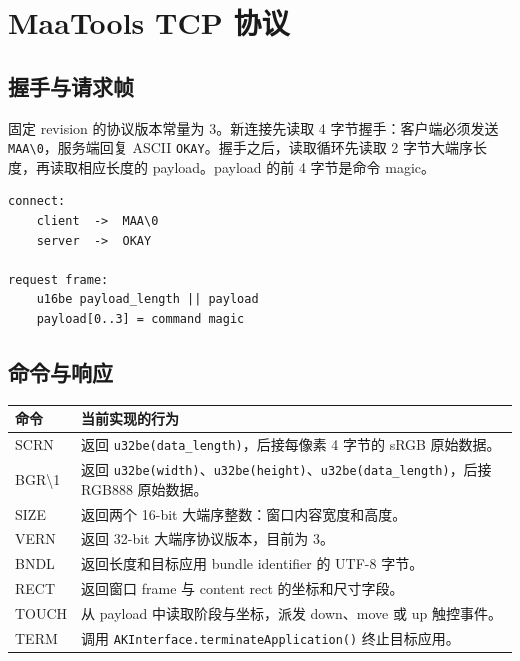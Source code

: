 \documentclass[UTF8,a4paper,11pt]{ctexart}
\begin{document}
\section{MaaTools TCP 协议}

\subsection{握手与请求帧}

固定 revision 的协议版本常量为 3。新连接先读取 4 字节握手：客户端必须发送 \texttt{MAA\textbackslash{}0}，服务端回复 ASCII \texttt{OKAY}。握手之后，读取循环先读取 2 字节大端序长度，再读取相应长度的 payload。payload 的前 4 字节是命令 magic。

\begin{lstlisting}
connect:
    client  ->  MAA\0
    server  ->  OKAY

request frame:
    u16be payload_length || payload
    payload[0..3] = command magic
\end{lstlisting}

\subsection{命令与响应}

\begin{center}
\small
\begin{tabularx}{\textwidth}{>{\ttfamily\raggedright\arraybackslash}p{} X}
\toprule
命令 & 当前实现的行为 \\
\midrule
SCRN & 返回 \texttt{u32be(data\_length)}，后接每像素 4 字节的 sRGB 原始数据。\\
BGR\textbackslash{}1 & 返回 \texttt{u32be(width)}、\texttt{u32be(height)}、\texttt{u32be(data\_length)}，后接 RGB888 原始数据。\\
SIZE & 返回两个 16-bit 大端序整数：窗口内容宽度和高度。\\
VERN & 返回 32-bit 大端序协议版本，目前为 3。\\
BNDL & 返回长度和目标应用 bundle identifier 的 UTF-8 字节。\\
RECT & 返回窗口 frame 与 content rect 的坐标和尺寸字段。\\
TOUCH & 从 payload 中读取阶段与坐标，派发 down、move 或 up 触控事件。\\
TERM & 调用 \texttt{AKInterface.terminateApplication()} 终止目标应用。\\
\bottomrule
\end{tabularx}
\end{center}
\end{document}
